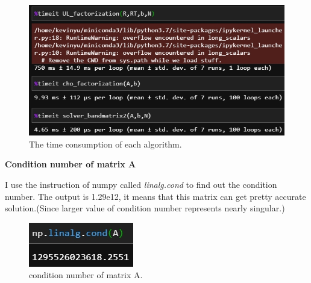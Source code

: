 \documentclass{article}
\begin{document}
\begin{figure}[h]
    \centering 
	\includegraphics[scale=0.55]{pro4_time.jpg}
	\caption{The time consumption of each algorithm.} %
	\label{fig4_time} %
\end{figure}

\textbf{Condition number of matrix A}

I use the instruction of numpy called \emph{linalg.cond} to find out the condition number. The output is 1.29e12, it means that this matrix can get pretty accurate solution.(Since larger value of condition number represents nearly singular.)
\begin{figure}[h]
    \centering 
	\includegraphics[scale=0.55]{pro4_condition.jpg}
	\caption{condition number of matrix A.} %
	\label{fig4_condition} %
\end{figure}
\end{document}

